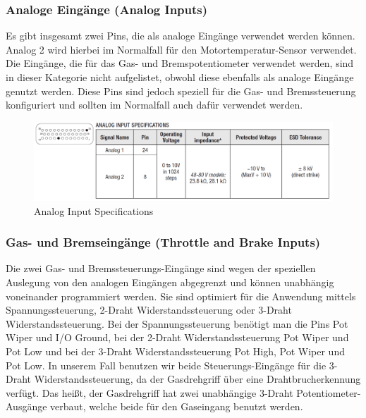 \subsubsection{Analoge Eingänge (Analog Inputs)}
Es gibt insgesamt zwei Pins, die als analoge Eingänge verwendet werden können. Analog 2 wird hierbei im Normalfall für den Motortemperatur-Sensor verwendet. Die Eingänge, die für das Gas- und Bremspotentiometer verwendet werden, sind in dieser Kategorie nicht aufgelistet, obwohl diese ebenfalls als analoge Eingänge genutzt werden. Diese Pins sind jedoch speziell für die Gas- und Bremssteuerung konfiguriert und sollten im Normalfall auch dafür verwendet werden.

\begin{figure}[H]
	\begin{center}
		\includegraphics[width=\textwidth]{figures/antrieb/Analog_Input_Specifications.png}
		\caption{Analog Input Specifications}
	\end{center}
\end{figure}



\newpage



\subsubsection{Gas- und Bremseingänge (Throttle and Brake Inputs)}
Die zwei Gas- und Bremssteuerungs-Eingänge sind wegen der speziellen Auslegung von den analogen Eingängen abgegrenzt und können unabhängig voneinander programmiert werden. Sie sind optimiert für die Anwendung mittels Spannungssteuerung, 2-Draht Widerstandssteuerung oder 3-Draht Widerstandssteuerung. Bei der Spannungssteuerung benötigt man die Pins Pot Wiper und I/O Ground, bei der 2-Draht Widerstandssteuerung Pot Wiper und Pot Low und bei der 3-Draht Widerstandssteuerung Pot High, Pot Wiper und Pot Low. In unserem Fall benutzen wir beide Steuerungs-Eingänge für die 3-Draht Widerstandssteuerung, da der Gasdrehgriff über eine Drahtbrucherkennung verfügt. Das heißt, der Gasdrehgriff hat zwei unabhängige 3-Draht Potentiometer-Ausgänge verbaut, welche beide für den Gaseingang benutzt werden.

